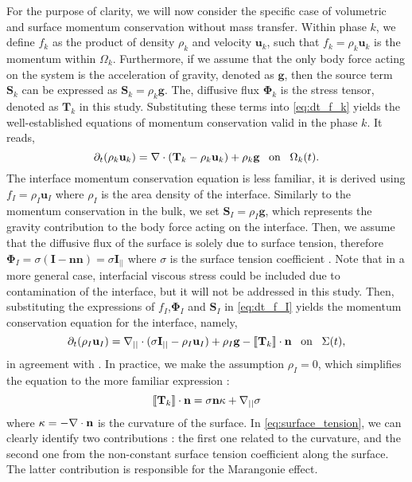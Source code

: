 For the purpose of clarity, we will now consider the specific case of volumetric and surface momentum conservation without mass transfer.
Within phase $k$, we define $f_k$ as the product of density $\rho_k$ and velocity $\textbf{u}_k$, such that $f_k = \rho_k \textbf{u}_k$ is the momentum within $\Omega_k$.
Furthermore, if we assume that the only body force acting on the system is the acceleration of gravity, denoted as $\textbf{g}$, then the source term $\textbf{S}_k$ can be expressed as $\textbf{S}_k = \rho_k \textbf{g}$.
The, diffusive flux $\mathbf{\Phi}_k$ is the stress tensor, denoted as $\textbf{T}_k$ in this study. 
Substituting these terms into \ref{eq:dt_f_k} yields the well-established equations of momentum conservation valid in the phase $k$. 
It reads, 
\begin{equation}
    \partial_t (\rho_k\textbf{u}_k)  
    = 
    \mathbf{\nabla} \cdot (\textbf{T}_k - \rho_k\textbf{u}_k)
    + \rho_k \textbf{g}
     \;\;\; \text{on} \;\;\;\Omega_k(t).
     \label{eq:dt_rhou_k}
\end{equation} 
The interface momentum conservation equation is less familiar, it is derived using $f_I = \rho_I \textbf{u}_I$ \citep{morel2015mathematical} where $\rho_I$ is the area density of the interface. 
Similarly to the momentum conservation in the bulk, we set $\textbf{S}_I = \rho_I \textbf{g}$, which represents the gravity contribution to the body force acting on the interface. 
Then, we assume that the diffusive flux of the surface is solely due to surface tension, therefore $\mathbf{\Phi}_I  = \sigma (\textbf{I} - \textbf{nn}) = \sigma \textbf{I}_{||}$ where $\sigma$ is the surface tension coefficient \citep[Chapter 2]{tryggvason2011direct}.  
Note that in a more general case, interfacial viscous stress could be included \citep{brenner2013interfacial,slattery2007interfacial} due to contamination of the interface, but it will not be addressed in this study. 
Then, substituting the expressions of $f_I$,$\mathbf{\Phi}_I$ and $\textbf{S}_I$ in \ref{eq:dt_f_I} yields the momentum conservation equation for the interface, namely,
\begin{equation*}
    \partial_t (\rho_I\textbf{u}_I)  
    = 
    \mathbf{\nabla}_{||} \cdot (\sigma \textbf{I}_{||} - \rho_I\textbf{u}_I)
    + \rho_I \textbf{g}
    - \llbracket 
        \mathbf{T}_k
     \rrbracket \cdot \textbf{n} \;\;\; \text{on} \;\;\;\Sigma(t),
\end{equation*} 
in agreement with \citet{manikantan2020surfactant}. 
In practice, we make the assumption $\rho_I = 0$, which simplifies the equation to the more familiar expression :
\begin{equation}
    \llbracket \textbf{T}_k \rrbracket \cdot \textbf{n} 
    =
    \sigma\textbf{n}\kappa
    + \mathbf{\nabla}_{||}\sigma 
    \label{eq:surface_tension}
\end{equation}
where $\kappa = - \mathbf{\nabla}\cdot\textbf{n}$ is the curvature of the surface.
In \ref{eq:surface_tension}, we can clearly identify two contributions : the first one related to the curvature, and the second one from the non-constant surface tension coefficient along the surface. 
The latter contribution is responsible for the Marangonie effect.


